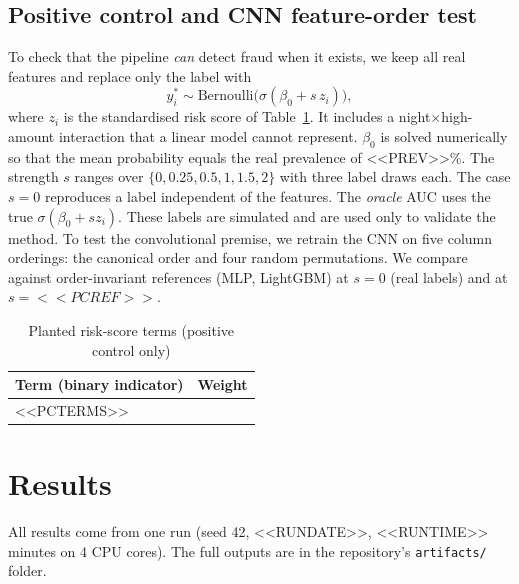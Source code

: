 \documentclass[conference]{IEEEtran}
\begin{document}
\subsection{Positive control and CNN feature-order test}\label{sec:pcmethod}
To check that the pipeline \emph{can} detect fraud when it exists, we keep all real features and replace only the label with
\begin{equation}
y_i^{*}\sim\text{Bernoulli}\big(\sigma(\beta_0 + s\,z_i)\big),
\end{equation}
where $z_i$ is the standardised risk score of Table~\ref{tab:pcterms}. It includes a night$\times$high-amount interaction that a linear model cannot represent. $\beta_0$ is solved numerically so that the mean probability equals the real prevalence of <<PREV>>\%. The strength $s$ ranges over $\{0,0.25,0.5,1,1.5,2\}$ with three label draws each. The case $s=0$ reproduces a label independent of the features. The \emph{oracle} AUC uses the true $\sigma(\beta_0+s z_i)$. These labels are simulated and are used only to validate the method. To test the convolutional premise, we retrain the CNN on five column orderings: the canonical order and four random permutations. We compare against order-invariant references (MLP, LightGBM) at $s=0$ (real labels) and at $s=<<PCREF>>$.

\begin{table}[t]
\centering
\caption{Planted risk-score terms (positive control only)}\label{tab:pcterms}
\footnotesize
\begin{tabular}{@{}lr@{}}
\toprule
Term (binary indicator) & Weight \\
\midrule
<<PCTERMS>>
\bottomrule
\end{tabular}
\end{table}

\section{Results}
All results come from one run (seed 42, <<RUNDATE>>, <<RUNTIME>> minutes on 4 CPU cores). The full outputs are in the repository's \texttt{artifacts/} folder.
\end{document}
